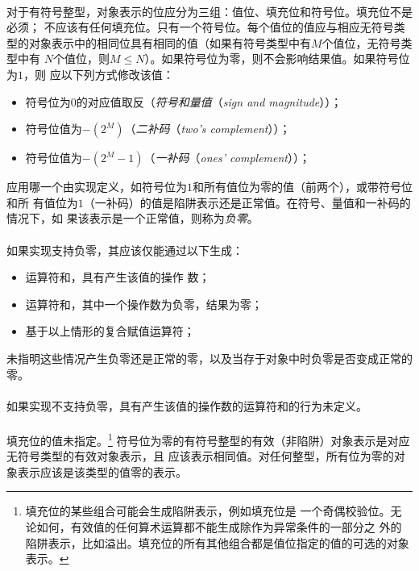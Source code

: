 \paragraph{}
对于有符号整型，对象表示的位应分为三组：值位、填充位和符号位。填充位不是必须；
不应该有任何填充位。只有一个符号位。每个值位的值应与相应无符号类
型的对象表示中的相同位具有相同的值（如果有符号类型中有$M$个值位，无符号类型中有
$N$个值位，则$M \le N$）。如果符号位为零，则不会影响结果值。如果符号位为$1$，则
应以下列方式修改该值：
\begin{itemize}
  \item{符号位为$0$的对应值取反（\textit{符号和量值}（\textit{sign and
    magnitude}））；}
  \item{符号位值为$-(2^M)$（\textit{二补码}（\textit{two's complement}））；}
  \item{符号位值为$-(2^M-1)$（\textit{一补码}（\textit{ones' complement}））；}
\end{itemize}
应用哪一个由实现定义，如符号位为$1$和所有值位为零的值（前两个），或带符号位和所
有值位为$1$（一补码）的值是陷阱表示还是正常值。在符号、量值和一补码的情况下，如
果该表示是一个正常值，则称为\textit{负零}。

\paragraph{}
如果实现支持负零，其应该仅能通过以下生成：
\begin{itemize}
  \item{运算符和\tm{\tg{}\tg{}}，具有产生该值的操作
    数；}
  \item{运算符和\tm{\%}，其中一个操作数为负零，结果为零；}
  \item{基于以上情形的复合赋值运算符；}
\end{itemize}
未指明这些情况产生负零还是正常的零，以及当存于对象中时负零是否变成正常的零。

\paragraph{}
如果实现不支持负零，具有产生该值的操作数的运算符和\tm{\tg{}\tg{}}的行为未定义。

\paragraph{}
填充位的值未指定。\footnote{填充位的某些组合可能会生成陷阱表示，例如填充位是
一个奇偶校验位。无论如何，有效值的任何算术运算都不能生成除作为异常条件的一部分之
外的陷阱表示，比如溢出。填充位的所有其他组合都是值位指定的值的可选的对象表示。}
符号位为零的有符号整型的有效（非陷阱）对象表示是对应无符号类型的有效对象表示，且
应该表示相同值。对任何整型，所有位为零的对象表示应该是该类型的值零的表示。

